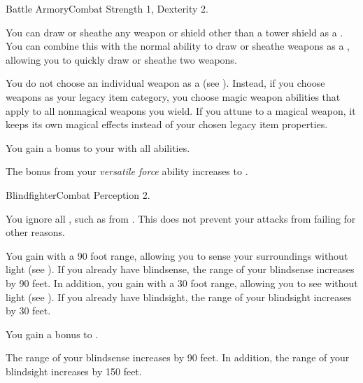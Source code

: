     \begin{feat}{Battle Armory}{Combat}
        \featpre Strength 1, Dexterity 2.

         You can draw or sheathe any weapon or shield other than a tower shield as a .
        You can combine this with the normal ability to draw or sheathe weapons as a , allowing you to quickly draw or sheathe two weapons.

         You do not choose an individual weapon as a  (see ).
        Instead, if you choose weapons as your legacy item category, you choose magic weapon abilities that apply to all nonmagical weapons you wield.
        If you attune to a magical weapon, it keeps its own magical effects instead of your chosen legacy item properties.

         You gain a  bonus to your  with all abilities.

         The bonus from your \textit{versatile force} ability increases to .
    \end{feat}

    \begin{feat}{Blindfighter}{Combat}
        \featpre Perception 2.

         You ignore all , such as from .
        This does not prevent your attacks from failing for other reasons.

         You gain  with a 90 foot range, allowing you to sense your surroundings without light (see ).
        If you already have blindsense, the range of your blindsense increases by 90 feet.
        In addition, you gain  with a 30 foot range, allowing you to see without light (see ).
        If you already have blindsight, the range of your blindsight increases by 30 feet.

         You gain a  bonus to .

         The range of your blindsense increases by 90 feet.
        In addition, the range of your blindsight increases by 150 feet.
    \end{feat}

